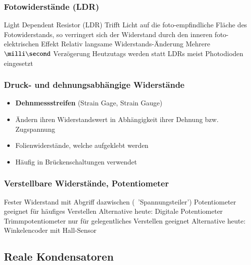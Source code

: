 \subsubsection{Fotowiderstände (LDR)}

\begin{outline}
    \1 Light Dependent Resistor (LDR)
    \1 Trifft Licht auf die foto-empfindliche Fläche des Fotowiderstands, so verringert sich der Widerstand durch den 
        inneren foto-elektrischen Effekt
    \1 Relativ langsame Widerstands-Änderung
        \2 Mehrere $\milli \second$ Verzögerung
    \1 Heutzutags werden statt LDRs meist Photodioden eingesetzt
\end{outline}


\subsubsection{Druck- und dehnungsabhängige Widerstände}

\begin{itemize}
    \item \textbf{Dehnmessstreifen} (Strain Gage, Strain Gauge)
    \item Ändern ihren Widerstandswert in Abhängigkeit ihrer Dehnung bzw. Zugspannung
    \item Folienwiderstände, welche aufgeklebt werden
    \item Häufig in Brückenschaltungen verwendet 
\end{itemize}


\subsubsection{Verstellbare Widerstände, Potentiometer}

\begin{outline}
    \1 Fester Widerstand mit Abgriff dazwischen (\textrightarrow\ 'Spannungsteiler')
    \1 Potentiometer geeignet für häufiges Verstellen
        \2 Alternative heute: Digitale Potentiometer
    \1 Trimmpotentiometer nur für gelegentliches Verstellen geeignet
        \2 Alternative heute: Winkelencoder mit Hall-Sensor
\end{outline}


\subsection{Reale Kondensatoren}

